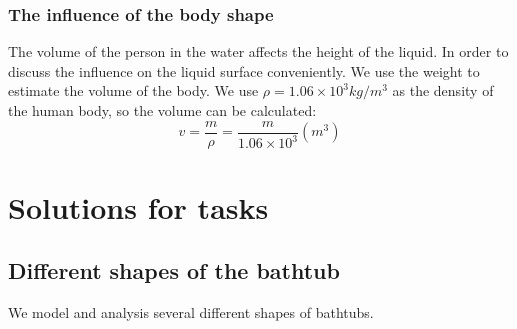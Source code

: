 \documentclass{mcmthesis}
\begin{document}
\subsubsection{The influence of the body shape}
The volume of the person in the water affects the height of the liquid. In order to discuss the influence on the liquid surface conveniently. We use the weight to estimate the volume of the body. We use $\rho =1.06\times10^{3}kg/m^{3}$ as the density of the human body, so the volume can be calculated:
\begin{equation}
v=\frac{m}{\rho }=\frac{m}{1.06\times 10^{3}}(m^{3})
\end{equation}
\section{Solutions for tasks }
\subsection{Different shapes of the bathtub}
We model and analysis several different shapes of bathtubs.
\end{document}
